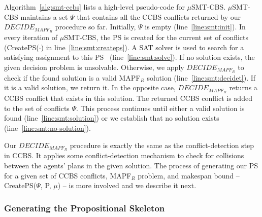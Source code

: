 \documentclass[review]{elsarticle}
\newcommand{\implicitct}{\textit{ImplicitCT}\xspace}
\newcommand{\decidet}{\ensuremath{\mathit{DECIDE_T}}\xspace}
\newcommand{\decidemapfr}{\ensuremath{\mathit{DECIDE_{MAPF_R}}}\xspace}
\newcommand{\ccbs}{\ac{CCBS}\xspace}
\newcommand{\ct}{\ac{CT}\xspace}
\newcommand{\ps}{\ac{PS}\xspace}
\newcommand{\mapfr}{\ac{MAPF}$_R$\xspace}
\newcommand{\smtcbs}{SMT-CBS\xspace}
\newcommand{\mapf}{\ac{MAPF}\xspace}
\begin{document}
Algorithm~\ref{alg:smt-ccbs} lists a high-level pseudo-code for $\mu$\smtcbs. 
$\mu$\smtcbs maintains a set $\Psi$ that contains all the \ccbs conflicts returned by our \decidemapfr procedure so far. 
Initially, $\Psi$ is empty (line~\ref{line:smt:init}). 
In every iteration of $\mu$\smtcbs, the \ps is created for the current set of conflicts (CreatePS($\cdot$) in line~\ref{line:smt:createps}). 
A SAT solver is used to search for a satisfying assignment to this \ps~ (line~\ref{line:smt:solve}). 
If no solution exists, the given decision problem is unsolvable. 
Otherwise, we apply \decidemapfr to check if the found solution is a valid \mapfr solution (line~\ref{line:smt:decidet}). 
If it is a valid solution, we return it.
In the opposite case, \decidemapfr returns a \ccbs conflict that exists in this solution. 
The returned \ccbs conflict is added to the set of conflicts $\Psi$. 
This process continues until either a valid solution is found (line~\ref{line:smt:solution}) or we establish that no solution exists (line~\ref{line:smt:no-solution}).



Our \decidemapfr procedure is exactly the same as the conflict-detection step in \ccbs. 
It applies some conflict-detection mechanism to check for collisions between the agents' plans in the given solution. 
The process of generating our \ps for a given set of \ccbs conflicts, \mapfr problem, and makespan bound -- CreatePS($\Psi$, P, $\mu$) -- is more involved and we describe it next. 







\subsubsection{Generating the Propositional Skeleton}
\label{sec:propositional-skeleton}





\end{document}
